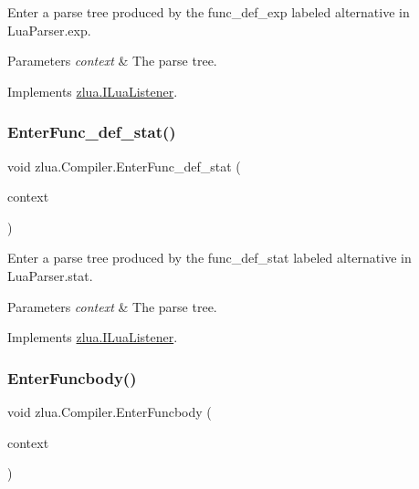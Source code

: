 Enter a parse tree produced by the {\ttfamily func\+\_\+def\+\_\+exp} labeled alternative in Lua\+Parser.\+exp. 


\begin{DoxyParams}{Parameters}
{\em context} & The parse tree.\\
\hline
\end{DoxyParams}


Implements \mbox{\hyperlink{interfacezlua_1_1_i_lua_listener_a4f05c6d0e5bd9d2515029fd34d8f5402}{zlua.\+I\+Lua\+Listener}}.

\mbox{\label{classzlua_1_1_compiler_a2a2bdb04e6e4f416e0f6141c26981c3f}} 
\subsubsection{\texorpdfstring{Enter\+Func\+\_\+def\+\_\+stat()}{EnterFunc\_def\_stat()}}
{\footnotesize\ttfamily void zlua.\+Compiler.\+Enter\+Func\+\_\+def\+\_\+stat (\begin{DoxyParamCaption}\item[{\mbox{[}\+Not\+Null\mbox{]} \mbox{\hyperlink{classzlua_1_1_lua_parser_1_1_func__def__stat_context}{Lua\+Parser.\+Func\+\_\+def\+\_\+stat\+Context}}}]{context }\end{DoxyParamCaption})}



Enter a parse tree produced by the {\ttfamily func\+\_\+def\+\_\+stat} labeled alternative in Lua\+Parser.\+stat. 


\begin{DoxyParams}{Parameters}
{\em context} & The parse tree.\\
\hline
\end{DoxyParams}


Implements \mbox{\hyperlink{interfacezlua_1_1_i_lua_listener_a2f03132612731ef3355f1453b3cb4686}{zlua.\+I\+Lua\+Listener}}.

\mbox{\label{classzlua_1_1_compiler_a0ccbdaa518f36c6a9145c36adf12dd2e}} 
\subsubsection{\texorpdfstring{Enter\+Funcbody()}{EnterFuncbody()}}
{\footnotesize\ttfamily void zlua.\+Compiler.\+Enter\+Funcbody (\begin{DoxyParamCaption}\item[{\mbox{[}\+Not\+Null\mbox{]} \mbox{\hyperlink{classzlua_1_1_lua_parser_1_1_funcbody_context}{Lua\+Parser.\+Funcbody\+Context}}}]{context }\end{DoxyParamCaption})}



